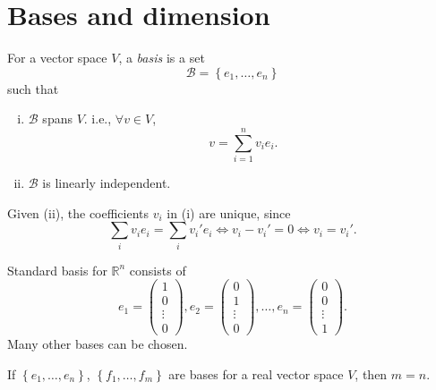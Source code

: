 \documentclass[10pt]{article}
\begin{document}
    \section{Bases and dimension}
    \begin{definition}
        For a vector space $V$, a \textit{basis} is a set 
        \[
            \mathcal{B}= \left\{ e_1,\dots, e_n\right\}
        \]
        such that 
        \begin{enumerate}[(i)]
            \item $ \mathcal{B} $ spans $V$. i.e., $ \forall v\in V $, 
            \[
                v = \sum_{i=1}^{n}v_i e_i
            .\]
            \item $ \mathcal{B} $ is linearly independent.
        \end{enumerate}
        Given (ii), the coefficients $v_i$ in (i) are unique, since 
        \[
            \sum_{i}v_ie_i=\sum_{i}v_i'e_i \Longleftrightarrow v_i-v_i'=0 \Longleftrightarrow v_i=v_i'
        .\]
    \end{definition}
    \begin{example}
        Standard basis for $ \mathbb{R}^n $ consists of 
        \[
            e_1=\begin{pmatrix}
                1\\
                0\\
                \vdots\\
                0
            \end{pmatrix},
            e_2 = \begin{pmatrix}
                0\\
                1\\
                \vdots\\
                0
            \end{pmatrix},
            \dots,
            e_n=\begin{pmatrix}
                0\\
                0\\
                \vdots\\
                1
            \end{pmatrix}
        .\]
        Many other bases can be chosen.
    \end{example}
    \begin{theorem}\label{thm:dimension}
        If $ \left\{ e_1,\dots,e_n\right\} $, $ \left\{ f_1,\dots,f_m\right\} $ are bases for a real vector space $V$, then $m=n$.
    \end{theorem}
\end{document}
